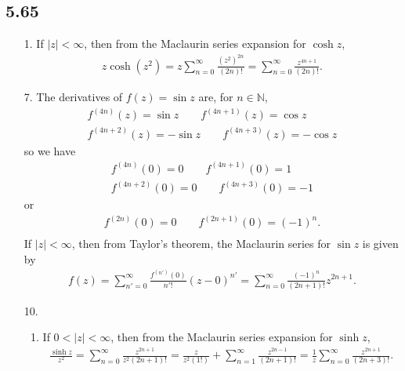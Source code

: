 \documentclass[a4paper,12pt]{article}
\begin{document}
\subsection*{5.65}
\begin{enumerate}
    \item[1.]
        If $|z| < \infty$, then from the Maclaurin series expansion for $\cosh z$,
        \begin{align*}
            z \cosh(z^2) = z \sum_{n = 0}^\infty \frac{(z^2)^{2n}}{(2n)!} = \sum_{n = 0}^\infty \frac{z^{4n + 1}}{(2n)!}.
        \end{align*}

    \item[7.]
        The derivatives of $f(z) = \sin z$ are, for $n \in \mathbb{N}$,
        \begin{gather*}
            f^{(4n)}(z) = \sin z \qquad f^{(4n + 1)}(z) = \cos z \\
            f^{(4n + 2)}(z) = -\sin z \qquad f^{(4n + 3)}(z) = -\cos z
        \end{gather*}
        so we have
        \begin{gather*}
            f^{(4n)}(0) = 0 \qquad f^{(4n + 1)}(0) = 1 \\
            f^{(4n + 2)}(0) = 0 \qquad f^{(4n + 3)}(0) = -1
        \end{gather*}
        or
        \begin{gather*}
            f^{(2n)}(0) = 0 \qquad f^{(2n + 1)}(0) = (-1)^n. \\
        \end{gather*}
        If $|z| < \infty$, then from Taylor's theorem, the Maclaurin series for $\sin z$ is given by
        \begin{align*}
            f(z) = \sum_{n' = 0}^\infty \frac{f^{(n')}(0)}{n'!} (z - 0)^{n'} = \sum_{n = 0}^\infty \frac{(-1)^n}{(2n + 1)!} z^{2n + 1}.
        \end{align*}

    \item[10.]
        \begin{enumerate}
            \item
                If $0 < |z| < \infty$, then from the Maclaurin series expansion for $\sinh z$,
                \begin{align*}
                    \frac{\sinh z}{z^2} = \sum_{n = 0}^\infty \frac{z^{2n + 1}}{z^2(2n + 1)!} = \frac{z}{z^2(1!)} + \sum_{n = 1}^\infty \frac{z^{2n - 1}}{(2n + 1)!} = \frac{1}{z} \sum_{n = 0}^\infty \frac{z^{2n + 1}}{(2n + 3)!}.
                \end{align*}


\end{enumerate}
\end{enumerate}
\end{document}
